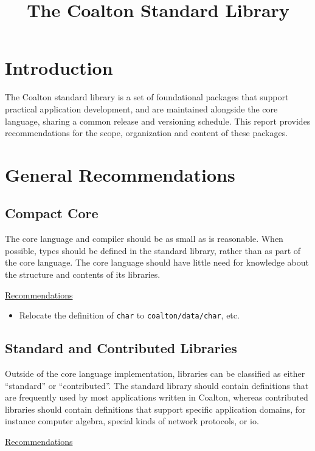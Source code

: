 \documentclass[12pt]{article}
\title{The Coalton Standard Library}
\newcommand{\code}{\texttt}
\begin{document}
\maketitle
\section{Introduction}
The Coalton standard library is a set of foundational packages that
support practical application development, and are maintained alongside
the core language, sharing a common release and versioning
schedule. This report provides recommendations for the scope,
organization and content of these packages.

\section{General Recommendations}

\subsection{Compact Core}

The core language and compiler should be as small as is reasonable.
When possible, types should be defined in the standard library, rather
than as part of the core language. The core language should have
little need for knowledge about the structure and contents of its
libraries.

\medskip
\underline{Recommendations}

\begin{itemize}
\item Relocate the definition of \code{char} to
  \code{coalton/data/char}, etc.
\end{itemize}

\subsection{Standard and Contributed Libraries}

Outside of the core language implementation, libraries can be
classified as either ``standard'' or ``contributed''.  The standard
library should contain definitions that are frequently used by most
applications written in Coalton, whereas contributed libraries should
contain definitions that support specific application domains, for
instance computer algebra, special kinds of network protocols, or io.

\medskip
\underline{Recommendations}
\end{document}
